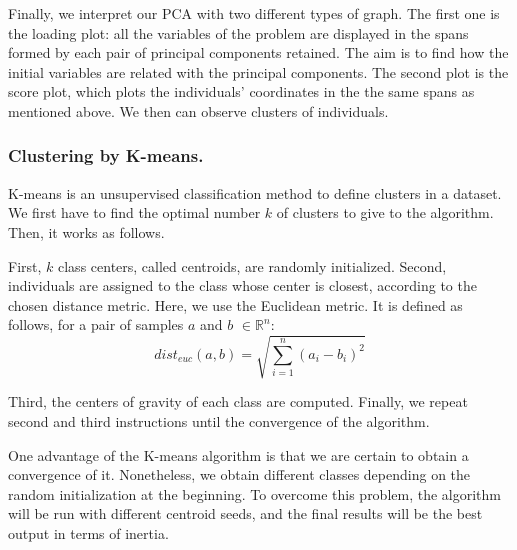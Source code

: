 Finally, we interpret our PCA with two different types of graph. The first one is the loading plot: all the variables of the problem are displayed in the spans formed by each pair of principal components retained. The aim is to find how the initial variables are related with the principal components. The second plot is the score plot, which plots the individuals' coordinates in the the same spans as mentioned above. We then can observe clusters of individuals.

\subsubsection{Clustering by K-means.}

K-means is an unsupervised classification method to define clusters in a dataset. We first have to find the optimal number $k$ of clusters to give to the algorithm. Then, it works as follows.

First, $k$ class centers, called centroids, are randomly initialized. Second, individuals are assigned to the class whose center is closest, according to the chosen distance metric. Here, we use the Euclidean metric. It is defined as follows, for a pair of samples $a$ and $b$ $\in \mathbb{R}^n$:
\begin{equation}
    dist_{euc}(a,b) = \sqrt{\sum^n_{i=1} (a_i - b_i)^2}
\end{equation}

Third, the centers of gravity of each class are computed. Finally, we repeat second and third instructions until the convergence of the algorithm.

One advantage of the K-means algorithm is that we are certain to obtain a convergence of it. Nonetheless, we obtain different classes depending on the random initialization at the beginning. To overcome this problem, the algorithm will be run with different centroid seeds, and the final results will be the best output in terms of inertia.